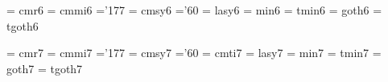  \font\sixrm  = cmr6               %
 \font\sixmi  = cmmi6              %
    \skewchar\sixmi ='177          %
 \font\sixsy  = cmsy6              %
    \skewchar\sixsy ='60           %
 \font\sixly  = lasy6             %
\font\sixmin  = min6               %
\font\sixtmin = tmin6              %
\font\sixgt   = goth6              %
\font\sixtgt  = tgoth6             %
  

 \font\sevrm  = cmr7               %
 \font\sevmi  = cmmi7              %
    \skewchar\sevmi ='177          %
 \font\sevsy  = cmsy7              %
    \skewchar\sevsy ='60           %
 \font\sevit  = cmti7              %
 \font\sevly  = lasy7             %
\font\sevmin  = min7               %
\font\sevtmin = tmin7              %
\font\sevgt   = goth7              %
\font\sevtgt  = tgoth7             %
  


